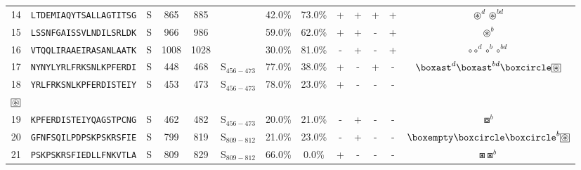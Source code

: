\begin{tabular}{rcccccccccccc}
14 &  \texttt{LTDEMIAQYTSALLAGTITSG} &       S &    865 &   885 &                &                          42.0\% &                           73.0\% &          + &           + &          + &           + &                                                                                                 $ \circledast^d \circledast^{bd} $ \\
15 &  \texttt{LSSNFGAISSVLNDILSRLDK} &       S &    966 &   986 &                &                          59.0\% &                           62.0\% &          + &           + &          - &           + &                                                                                                                  $ \circledast^b $ \\
16 &  \texttt{VTQQLIRAAEIRASANLAATK} &       S &   1008 &  1028 &                &                          30.0\% &                           81.0\% &          - &           + &          - &           + &                                                                                               $ \circ \circ^d \circ^b \circ^{bd} $ \\
17 &  \texttt{NYNYLYRLFRKSNLKPFERDI} &       S &    448 &   468 &  S$_{456-473}$ &                          77.0\% &                           38.0\% &          + &           - &          + &           - &                                              $ \boxast^d \boxast^{bd} \boxcircle \setlength{\fboxsep}{0.5pt} \boxed{\circledast} $ \\
18 &  \texttt{YRLFRKSNLKPFERDISTEIY} &       S &    453 &   473 &  S$_{456-473}$ &                          78.0\% &                           23.0\% &          + &           - &          - &           - &                    \Centerstack{  $\boxempty \boxast \boxast^b \boxcircle$ \\  $\setlength{\fboxsep}{0.5pt} \boxed{\circledast}$ } \\
19 &  \texttt{KPFERDISTEIYQAGSTPCNG} &       S &    462 &   482 &  S$_{456-473}$ &                          20.0\% &                           21.0\% &          - &           + &          - &           - &                                                                                                                   $ \boxcircle^b $ \\
20 &  \texttt{GFNFSQILPDPSKPSKRSFIE} &       S &    799 &   819 &  S$_{809-812}$ &                          21.0\% &                           23.0\% &          - &           + &          - &           - &                                              $ \boxempty \boxcircle \boxcircle^b \setlength{\fboxsep}{0.5pt} \boxed{\circledast} $ \\
21 &  \texttt{PSKPSKRSFIEDLLFNKVTLA} &       S &    809 &   829 &  S$_{809-812}$ &                          66.0\% &                            0.0\% &          + &           - &          - &           - &                                                                                                              $ \boxast \boxast^b $ \\
\bottomrule
\end{tabular}
